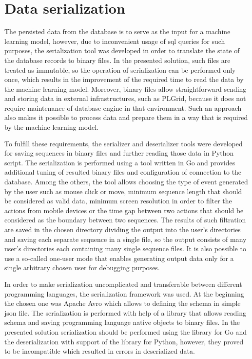 \section{Data serialization}\label{sec:data-serialization}
The persisted data from the database is to serve as the input for a machine learning model, however, due to inconvenient usage of \gls{sql} queries for such purposes, the serialization tool was developed in order to translate the state of the database records to binary files.
In the presented solution, such files are treated as immutable, so the operation of serialization can be performed only once, which results in the improvement of the required time to read the data by the machine learning model.
Moreover, binary files allow straightforward sending and storing data in external infrastructures, such as PLGrid, because it does not require maintenance of database engine in that environment.
Such an approach also makes it possible to process data and prepare them in a way that is required by the machine learning model.

To fulfill these requirements, the serializer and deserializer tools were developed for saving sequences in binary files and further reading those data in Python script.
The serialization is performed using a tool written in Go and provides additional tuning of resulted binary files and configuration of connection to the database.
Among the others, the tool allows choosing the type of event generated by the user such as mouse click or move, minimum sequence length that should be considered as valid data, minimum screen resolution in order to filter the actions from mobile devices or the time gap between two actions that should be considered as the boundary between two sequences.
The results of such filtration are saved in the chosen directory dividing the output into the user's directories and saving each separate sequence in a single file, so the output consists of many user's directories each containing many single sequence files.
It is also possible to use a so-called one-user mode that enables generating output data only for a single arbitrary chosen user for debugging purposes.

In order to make serialization uncomplicated and transferable between different programming languages, the serialization framework was used.
At the beginning the chosen one was Apache Avro which allows to defining the schema in simple \gls{json} file.
The serialization is performed with help of a library that allows reading schema and saving programming language native objects to binary files.
In the presented solution serialization should be performed using the library for Go and the deserialization with support of the library for Python, however, they proved to be incompatible which resulted in errors in deserialized data.

